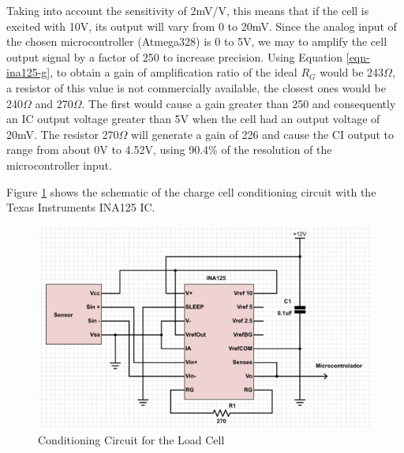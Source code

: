 		Taking into account the sensitivity of 2mV/V, this means that if the cell is excited with 10V, its output will vary from 0 to 20mV. Since the analog input of the chosen microcontroller (Atmega328) is 0 to 5V, we may to amplify the cell output signal by a factor of 250 to increase precision. Using Equation \ref{eqn-ina125-g}, to obtain a gain of amplification ratio of the ideal $R_{G}$ would be 243$\Omega$, a resistor of this value is not commercially available, the closest ones would be 240$\Omega$ and 270$\Omega$. The first would cause a gain greater than 250 and consequently an IC output voltage greater than 5V when the cell had an output voltage of 20mV. The resistor 270$\Omega$ will generate a gain of 226 and cause the CI output to range from about 0V to 4.52V, using 90.4\% of the resolution of the microcontroller input. 
		\par

		Figure \ref{fig-cic-cell} shows the schematic of the charge cell conditioning circuit with the Texas Instruments INA125 IC.

		\begin{figure}[htbp]
			\centering
				\includegraphics[scale=0.35]{figuras/fig-cic-cell.png}
			\caption{Conditioning Circuit for the Load Cell}
			\label{fig-cic-cell}
		\end{figure}
